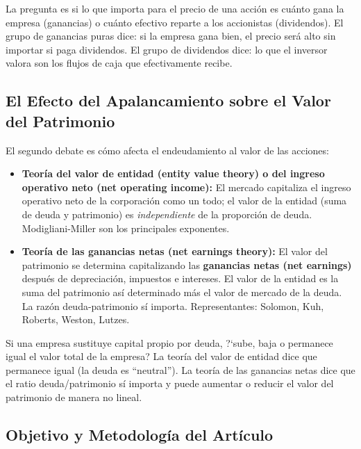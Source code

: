 \documentclass[12pt]{article}
\begin{document}
\begin{intuicion}
La pregunta es si lo que importa para el precio de una acci\'on es cu\'anto gana la empresa (ganancias) o cu\'anto efectivo reparte a los accionistas (dividendos). El grupo de ganancias puras dice: si la empresa gana bien, el precio ser\'a alto sin importar si paga dividendos. El grupo de dividendos dice: lo que el inversor valora son los flujos de caja que efectivamente recibe.
\end{intuicion}

\subsection{El Efecto del Apalancamiento sobre el Valor del Patrimonio}

El segundo debate es c\'omo afecta el endeudamiento al valor de las acciones:

\begin{itemize}
  \item \textbf{Teor\'ia del valor de entidad (entity value theory) o del ingreso operativo neto (net operating income):} El mercado capitaliza el ingreso operativo neto de la corporaci\'on como un todo; el valor de la entidad (suma de deuda y patrimonio) es \textit{independiente} de la proporci\'on de deuda. Modigliani-Miller son los principales exponentes.

  \item \textbf{Teor\'ia de las ganancias netas (net earnings theory):} El valor del patrimonio se determina capitalizando las \textbf{ganancias netas (net earnings)} despu\'es de depreciaci\'on, impuestos e intereses. El valor de la entidad es la suma del patrimonio as\'i determinado m\'as el valor de mercado de la deuda. La raz\'on deuda-patrimonio s\'i importa. Representantes: Solomon, Kuh, Roberts, Weston, Lutzes.
\end{itemize}

\begin{intuicion}
Si una empresa sustituye capital propio por deuda, ?`sube, baja o permanece igual el valor total de la empresa? La teor\'ia del valor de entidad dice que permanece igual (la deuda es ``neutral''). La teor\'ia de las ganancias netas dice que el ratio deuda/patrimonio s\'i importa y puede aumentar o reducir el valor del patrimonio de manera no lineal.
\end{intuicion}

\subsection{Objetivo y Metodolog\'ia del Art\'iculo}
\end{document}
